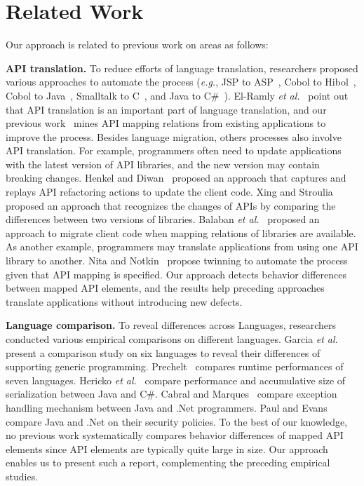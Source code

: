 \section{Related Work}
\label{sec:related}

Our approach is related to previous work on areas as follows:

\textbf{API translation.} To reduce efforts of language translation, researchers proposed various
approaches to automate the process (\emph{e.g.}, JSP to ASP~\cite{hassan2005lightweight}, Cobol to Hibol~\cite{waters1988program}, Cobol to Java~\cite{mossienko2003automated}, Smalltalk to C~\cite{yasumatsu1995spice}, and Java to C\#~\cite{el2006experiment}). El-Ramly \emph{et al.}~\cite{el2006experiment} point out that API translation is an important part of language translation, and our previous work~\cite{zhong2010mining} mines API mapping relations from existing applications to improve the process. Besides language migration, others processes also involve API translation. For example, programmers often need to update applications with the latest version of API libraries, and the new version may contain breaking changes. Henkel and Diwan~\cite{henkel2005catchup} proposed an approach that captures and replays API refactoring actions to update the client code. Xing and Stroulia~\cite{xing2007api} proposed an approach that recognizes the changes of APIs by comparing the differences between two versions of libraries. Balaban \emph{et al.}~\cite{balaban2005refactoring} proposed an approach to migrate client code when mapping relations of libraries are available. As another example, programmers may translate applications from using one API library to another. Nita and Notkin~\cite{nita2010using} propose twinning to automate the process given that API mapping is specified. Our approach detects behavior differences between mapped API elements, and the results help preceding approaches translate applications without introducing new defects.

\textbf{Language comparison.} To reveal differences across Languages, researchers conducted various empirical comparisons on different languages. Garcia \emph{et al.}~\cite{Garcia2003} present a comparison study on six languages to reveal their differences of supporting generic programming. Prechelt~\cite{prechelt2000empirical} compares runtime performances of seven languages. Hericko \emph{et al.}~\cite{944589} compare performance and accumulative size of serialization between Java and C\#. Cabral and Marques~\cite{cabral2007exception} compare exception handling mechanism between Java and .Net programmers. Paul and Evans~\cite{paul2006comparing} compare Java and .Net on their security policies. To the best of our knowledge, no previous work systematically compares behavior differences of mapped API elements since API elements are typically quite large in size. Our approach enables us to present such a report, complementing the preceding empirical studies.

